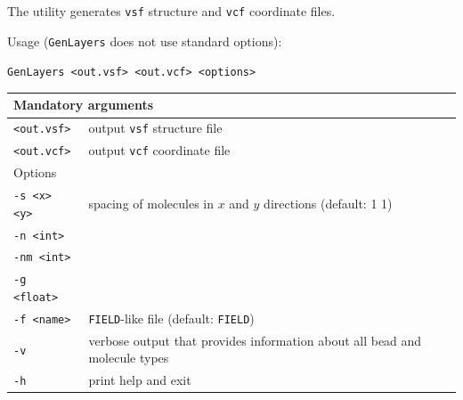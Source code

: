 The utility generates \texttt{vsf} structure and \texttt{vcf} coordinate
files.

Usage (\texttt{GenLayers} does not use standard options):

\vspace{1em}
\noindent
\texttt{GenLayers <out.vsf> <out.vcf> <options>}

\noindent
\begin{longtable}{p{}p{}}
  \toprule
  \multicolumn{2}{l}{Mandatory arguments} \\
  \midrule
  \texttt{<out.vsf>} & output \texttt{vsf} structure file \\
  \texttt{<out.vcf>} & output \texttt{vcf} coordinate file \\
  \toprule
  \multicolumn{2}{l}{Options} \\
  \midrule
  \texttt{-s <x> <y>} & spacing of molecules in $x$ and $y$ directions
    (default: 1 1) \\
  \texttt{-n <int>} & \\
  \texttt{-nm <int>} & \\
  \texttt{-g <float>} & \\
  \texttt{-f <name>} & \texttt{FIELD}-like file (default: \texttt{FIELD}) \\
  \texttt{-v}        & verbose output that provides information about all
    bead and molecule types \\
  \texttt{-h}        & print help and exit \\
  \bottomrule
\end{longtable}

